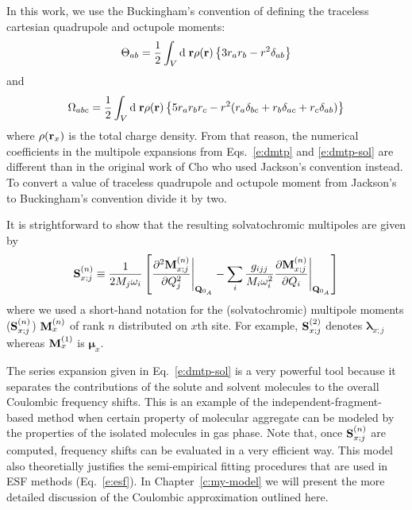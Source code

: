 \documentclass[a4paper,titlepage,twoside,fleqn,12pt]{book}
\newcommand{\BM}[1]{\bm{#1}}
\begin{document}
\begin{refsection}
In this work, we use the Buckingham's convention of defining the traceless cartesian
quadrupole and octupole moments:\citep{Buckingham.QRevChemSoc.1959} 
%
\begin{equation} \label{e:quad-trac}
\Theta_{ab} = \frac{1}{2} \int_V {\rm d}\;{\bf r} \rho({\bf r}) \left\{ 3r_ar_b-r^2 \delta_{ab}\right\}
\end{equation}
%
and 
%
\begin{equation} \label{e:oct-trac}
\Omega_{abc} = \frac{1}{2} \int_V {\rm d}\;{\bf r} \rho({\bf r}) \left\{ 5r_ar_br_c-r^2(r_a\delta_{bc}+
                                                                     r_b\delta_{ac}+
                                                                     r_c\delta_{ab})\right\}
\end{equation}
%
where $\rho({\bf r}_x)$ is the total charge density.
From that reason, the numerical coefficients in the multipole expansions 
from Eqs.~\eqref{e:dmtp} and \eqref{e:dmtp-sol}
are different than in the original work of Cho\citep{Cho.JCP.2009} who used 
Jackson's convention instead.\citep{Jackson.ClassicalElectrodynamics.1998} 
To convert a value of traceless
quadrupole and octupole moment from Jackson's to Buckingham's convention
divide it by two.

It is strightforward to show that the resulting solvatochromic multipoles
are given by
%
\begin{equation} \label{e:solvatochromic-multipoles}
 {\bf S}^{(n)}_{x;j} \equiv \frac{1}{2M_j\omega_i} \left[ 
     \frac{\partial^2 {\bf M}^{(n)}_{x;j} }{\partial Q_j^2} \Bigg|_{{\bf Q}_{0_A}}
-
\sum_i \frac{g_{ijj}}{M_i\omega_i^2} 
\frac{\partial {\bf M}^{(n)}_{x;j} }{\partial Q_i} \Bigg|_{{\bf Q}_{0_A}}
\right]
\end{equation}
%
where we used a short\hyp{}hand notation for the (solvatochromic) multipole moments
(${\bf S}^{(n)}_{x;j}$) ${\bf M}^{(n)}_{x}$
of rank $n$ distributed on $x$th site. For example, ${\bf S}^{(2)}_{x;j}$
denotes ${\BM \lambda}_{x;j}$ whereas ${\bf M}^{(1)}_{x}$ is ${\BM \mu}_x$.

The series expansion given in Eq.~\eqref{e:dmtp-sol} is a very powerful tool because
it separates the contributions of the solute and solvent molecules to the overall Coulombic
frequency shifts. This is an example of the independent-fragment-based method
when certain property of molecular aggregate can be modeled by the properties
of the isolated molecules in gas phase. Note that, once ${\bf S}^{(n)}_{x;j}$
are computed, frequency shifts can be evaluated in a very efficient way.
This model also theoretially justifies the semi\hyp{}empirical fitting procedures 
that are used in ESF methods (Eq.~\eqref{e:esf}).
In Chapter~\ref{c:my-model} we will present the more detailed discussion of the Coulombic
approximation outlined here.



\end{refsection}
\end{document}

